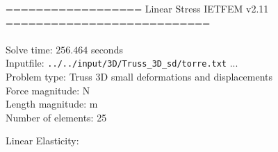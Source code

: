 \documentclass[a4paper,11pt]{article}
\begin{document}

================== Linear Stress IETFEM v2.11 ===========================\\\\


Solve time: $256.464$ seconds \\

Inputfile: \verb|../../input/3D/Truss_3D_sd/torre.txt|  ... \\

Problem type: Truss 3D small deformations and displacements\\ 

Force magnitude: N \\

Length magnitude: m \\

Number of elements: 25 \\

\newpage       

Linear Elasticity:\\
\end{document}
